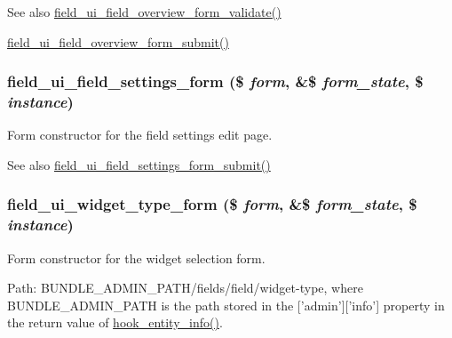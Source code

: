 \begin{DoxySeeAlso}{See also}
\hyperlink{field__ui_8admin_8inc_a1e5fb5a6f69ee3f155c3b433ad78ba1e}{field\_\-ui\_\-field\_\-overview\_\-form\_\-validate()} 

\hyperlink{field__ui_8admin_8inc_ae8451ea140d864dd6c91fd9ac6703764}{field\_\-ui\_\-field\_\-overview\_\-form\_\-submit()} 
\end{DoxySeeAlso}
\hypertarget{group__forms_gaf347f488d97997991b92aae7060a10f2}{
\subsubsection[{field\_\-ui\_\-field\_\-settings\_\-form}]{\setlength{\rightskip}{0pt plus 5cm}field\_\-ui\_\-field\_\-settings\_\-form (\$ {\em form}, \/  \&\$ {\em form\_\-state}, \/  \$ {\em instance})}}
\label{group__forms_gaf347f488d97997991b92aae7060a10f2}
Form constructor for the field settings edit page.

\begin{DoxySeeAlso}{See also}
\hyperlink{field__ui_8admin_8inc_a6fe96f11dbf7f63b4723c77abe423654}{field\_\-ui\_\-field\_\-settings\_\-form\_\-submit()} 
\end{DoxySeeAlso}
\hypertarget{group__forms_ga4dda66fe912ff3d86613df64b4a940e0}{
\subsubsection[{field\_\-ui\_\-widget\_\-type\_\-form}]{\setlength{\rightskip}{0pt plus 5cm}field\_\-ui\_\-widget\_\-type\_\-form (\$ {\em form}, \/  \&\$ {\em form\_\-state}, \/  \$ {\em instance})}}
\label{group__forms_ga4dda66fe912ff3d86613df64b4a940e0}
Form constructor for the widget selection form.

Path: BUNDLE\_\-ADMIN\_\-PATH/fields/field/widget-\/type, where BUNDLE\_\-ADMIN\_\-PATH is the path stored in the \mbox{[}'admin'\mbox{]}\mbox{[}'info'\mbox{]} property in the return value of \hyperlink{group__hooks_gaf02318e9d0e8cdbf6d187b271b9969a8}{hook\_\-entity\_\-info()}.

